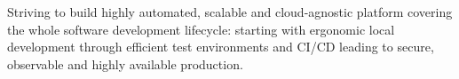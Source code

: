 

\begin{cvparagraph}
    Striving to build highly automated, scalable and cloud-agnostic platform covering the whole software development lifecycle:
    starting with ergonomic local development through efficient test environments and CI/CD leading to secure, observable and highly available production.
\end{cvparagraph}
